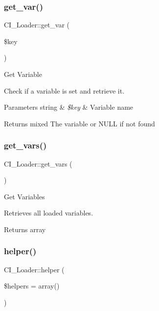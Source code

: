 \subsubsection{\texorpdfstring{get\+\_\+var()}{get\_var()}}
{\footnotesize\ttfamily C\+I\+\_\+\+Loader\+::get\+\_\+var (\begin{DoxyParamCaption}\item[{}]{\$key }\end{DoxyParamCaption})}

Get Variable

Check if a variable is set and retrieve it.


\begin{DoxyParams}[1]{Parameters}
string & {\em \$key} & Variable name \\
\hline
\end{DoxyParams}
\begin{DoxyReturn}{Returns}
mixed The variable or N\+U\+LL if not found 
\end{DoxyReturn}
\mbox{\label{class_c_i___loader_a81b647ad4f0ef893712facd67cb07d4f}} 
\subsubsection{\texorpdfstring{get\+\_\+vars()}{get\_vars()}}
{\footnotesize\ttfamily C\+I\+\_\+\+Loader\+::get\+\_\+vars (\begin{DoxyParamCaption}{ }\end{DoxyParamCaption})}

Get Variables

Retrieves all loaded variables.

\begin{DoxyReturn}{Returns}
array 
\end{DoxyReturn}
\mbox{\label{class_c_i___loader_a8f3936d69b6c7297131594642bb7037d}} 
\subsubsection{\texorpdfstring{helper()}{helper()}}
{\footnotesize\ttfamily C\+I\+\_\+\+Loader\+::helper (\begin{DoxyParamCaption}\item[{}]{\$helpers = {\ttfamily array()} }\end{DoxyParamCaption})}

